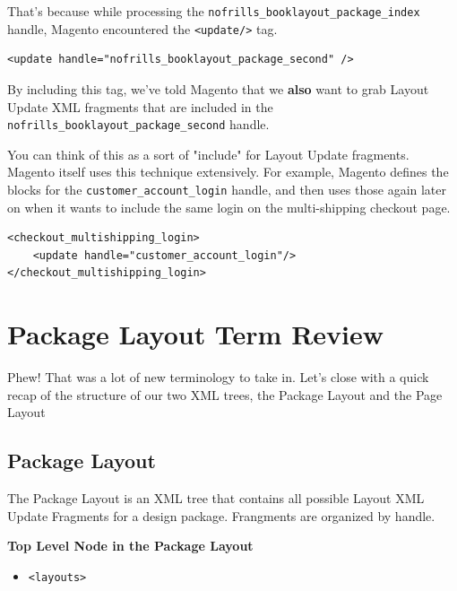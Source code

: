 \documentclass[oneside]{book}
\begin{document}
That's because while processing the \footnotesize\texttt{nofrills\_booklayout\_package\_index} \normalsize  handle, Magento encountered the \footnotesize\texttt{\textless update/\textgreater } \normalsize  tag.

\begin{lstlisting}
<update handle="nofrills_booklayout_package_second" />

\end{lstlisting}


By including this tag, we've told Magento that we \textbf{also} want to grab Layout Update XML fragments that are included in the \footnotesize\texttt{nofrills\_booklayout\_package\_second} \normalsize  handle.

You can think of this as a sort of "include" for Layout Update fragments. Magento itself uses this technique extensively.  For example, Magento defines the blocks for the \footnotesize\texttt{customer\_account\_login} \normalsize  handle, and then uses those again later on when it wants to include the same login on the multi-shipping checkout page. 

\begin{lstlisting}
<checkout_multishipping_login>
    <update handle="customer_account_login"/>
</checkout_multishipping_login>

\end{lstlisting}


\section{Package Layout Term Review}

Phew!  That was a lot of new terminology to take in.  Let's close with a quick recap of the structure of our two XML trees, the Package Layout and the Page Layout

\subsection{Package Layout}

The Package Layout is an XML tree that contains all possible Layout XML Update Fragments for a design package.  Frangments are organized by handle.

\textbf{Top Level Node in the Package Layout}

\begin{itemize}
\item \footnotesize\texttt{\textless layouts\textgreater } \normalsize 
\end{itemize}
\end{document}
